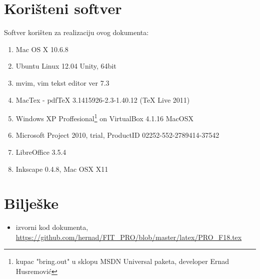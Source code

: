 \documentclass[times, utf8, seminar]{fit}
\begin{document}
\chapter{Korišteni softver}
Softver korišten za realizaciju ovog dokumenta:
\begin{enumerate}
  \item Mac OS X 10.6.8
  \item Ubuntu Linux 12.04 Unity, 64bit
  \item mvim, vim tekst editor ver 7.3
  \item MacTex - pdfTeX 3.1415926-2.3-1.40.12 (TeX Live 2011)
  \item Windows XP Proffesional\footnote{kupac "bring.out" u sklopu MSDN Universal paketa, developer Ernad Husremović} on VirtualBox 4.1.16 MacOSX 
  \item Microsoft Project 2010, trial, ProductID 02252-552-2789414-37542
  \item LibreOffice 3.5.4
  \item Inkscape 0.4.8, Mac OSX X11
\end{enumerate}


\chapter{Bilješke}
\label{chap:biljeske}

\begin{itemize}
  \item izvorni kod dokumenta, \url{https://github.com/hernad/FIT_PRO/blob/master/latex/PRO_F18.tex}
\end{itemize}
\end{document}
